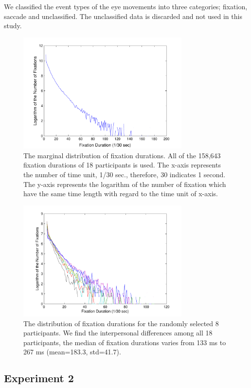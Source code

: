 \documentclass[10pt,letterpaper]{article}
\begin{document}
We classified the event types of the eye movements into three categories; fixation, saccade and unclassified. The unclassified data is discarded and not used in this study.

\begin{figure}
  \centerline{\includegraphics[width=86mm,trim=10mm 3mm 10mm 3mm]{./eps/marginal_fixation_duration.pdf}}
  \caption{The marginal distribution of fixation durations. All of the 158,643 fixation durations of 18 participants is used. The x-axis represents the number of time unit, 1/30 sec., therefore, 30 indicates 1 second. The y-axis represents the logarithm of the number of fixation which have the same time length with regard to the time unit of x-axis.}
  \label{fig:marginal-fixation-duration}
\end{figure}

\begin{figure}
  \centerline{\includegraphics[width=86mm,trim=10mm 3mm 10mm 3mm]{./eps/individual_fixation_duration.pdf}}
  \caption{The distribution of fixation durations for the randomly selected 8 participants. We find the interpersonal differences among all 18 participants, the median of fixation durations varies from 133 ms to 267 ms (mean=183.3, std=41.7).}
  \label{fig:individual-fixation-duration}
\end{figure}


\subsection{Experiment 2}
\end{document}

